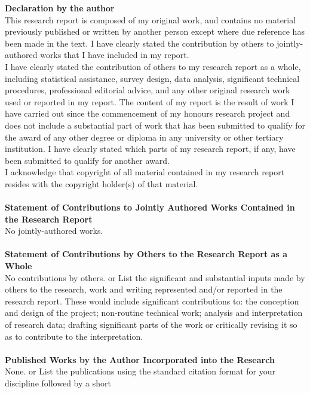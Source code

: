 \documentclass[a4paper, 12pt, openany]{book}
\begin{document}
\begin{footnotesize}

{\noindent
\textbf{Declaration by the author}\\
This	research	report	is	composed	of	my	original	work,	and	contains	no	material	
previously	published	or	written	by	another	person	except	where	due	reference	has	been	made	in	the	text.	I	have	clearly	stated	the	contribution	by	others	to	jointly-authored	works	that	I	have	
included	in	my	report.}\\
\indent I	have	clearly	stated	the	contribution	of	others	to	my	research	report	as	a	whole,	
including	statistical	assistance,	survey	design,	data	analysis,	significant	technical	procedures,	professional	editorial	advice,	and	any other	original	research	work	used	or	reported	in	my	
report.	The	content	of	my	report	is	the	result	of	work	I	have	carried	out	since	the	
commencement	of	my	honours	research	project	and	does	not	include	a	substantial	part	of	work	
that	has	been	submitted to	qualify	for	the	award	of	any	other	degree	or	diploma	in	any	
university	or	other	tertiary	institution.	I	have	clearly	stated	which	parts	of	my	research	report,	if	
any,	have	been	submitted	to	qualify	for	another	award.\\
\indent I	acknowledge	that	copyright	of	all	material	contained	in	my	research	report	resides	with	
the	copyright	holder(s)	of	that	material.
\\
\\
\textbf{Statement	of	Contributions	to	Jointly	Authored Works	Contained	in	the	Research	Report}
\\
No	jointly-authored	works.
\\
\\
\textbf{Statement	of	Contributions	by	Others	to	the	Research	Report	as	a	Whole}
\\
No	contributions	by	others.	or
List	the	significant	and	substantial	inputs	made	by	others	to	the	research,	work	and	writing	
represented	and/or	reported	in	the	research	report.	These	would	include	significant	
contributions	to:	the	conception	and	design	of	the	project;	non-routine	technical	work;	analysis	
and	interpretation	of	research	data;	drafting	significant	parts	of	the	work	or	critically	revising	it	
so	as	to	contribute	to	the	interpretation.
\\
\\
\textbf{Published	Works	by	the	Author	Incorporated	into	the	Research}\\
None.	or
List	the	publications	using	the	standard	citation	format	for	your	discipline	followed	by	a	short	

\end{footnotesize}
\end{document}
